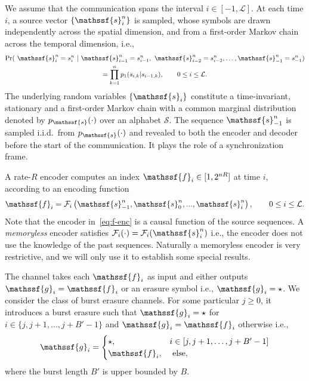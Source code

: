 \documentclass[journal, twocolumn, 10pt]{IEEEtran}
\newcommand{\cF}{{\mathcal{F}}}
\newcommand{\cS}{{\mathcal{S}}}
\newcommand{\rvf}{{\mathssf{f}}}    %
\newcommand{\rvg}{{\mathssf{g}}}    %
\newcommand{\rvs}{{\mathssf{s}}}    %
\begin{document}
We assume that the communication spans the interval $i\in [-1, \mathcal{L}]$. At each time $i$, a source vector $\{\rvs_i^n\}$ is sampled,  whose symbols are drawn independently across the spatial dimension, and from a first-order Markov chain across the temporal dimension, i.e., 
\begin{multline}
\Pr(~\rvs_i^n = s_i^n~|~\rvs_{i-1}^n = s_{i-1}^n,~\rvs_{i-2}^n = s_{i-2}^n,\ldots, \rvs^n_{-1}=s^n_{-1})  \\ = \prod_{k=1}^n p_{1}(s_{i,k}|s_{i-1,k}),
\qquad  0\le i \le \mathcal{L}.\label{eq:Markov}
\end{multline}
The underlying random variables $\{\rvs_i\}$ constitute a time-invariant, stationary and a first-order Markov chain with a common marginal distribution denoted by $p_\rvs(\cdot)$ over an alphabet $\cS$. The sequence $\rvs_{-1}^n$ is sampled i.i.d.\ from $p_\rvs(\cdot)$ and revealed to both the encoder and decoder before the start of the communication.  It plays the role of  a synchronization frame. %

A rate-$R$  encoder computes  an index $\rvf_i \in [1,2^{nR}]$ at  time $i$, according to an encoding function 
\begin{align}
\rvf_i=\mathcal{F}_i\left({\rvs}^n_{-1},{\rvs}^n_0,..., {\rvs}^n_{i}\right), \qquad  0\le i \le \mathcal{L}. \label{eq:f-enc}
\end{align} 
Note that the encoder in~\eqref{eq:f-enc} is a causal function of the source sequences. 
A {\em memoryless} encoder satisfies $\mathcal{F}_i(\cdot) = \cF_i(\rvs_i^n)$ i.e., the encoder does  not use the knowledge of the past sequences.  Naturally a memoryless encoder is very restrictive, and we will only use it to establish some special results. 

The channel takes each $\rvf_i$ as input and either outputs $\rvg_i = \rvf_i$ or an erasure symbol i.e., $\rvg_i=\star$. We consider the class of burst erasure channels. For some particular $j \ge 0$, it introduces a burst erasure such that  $\rvg_{i}=\star$ for $i\in\{j,j+1,...,j+B'-1\}$ and  $\rvg_{i}=\rvf_{i}$ otherwise i.e.,\begin{align}
\rvg_i =\begin{cases}
\star, &i \in [j,j+1,\ldots, j+B'-1]\\
\rvf_i, &\text{ else},
\end{cases}\label{eq:chModel}
\end{align} where the burst length $B'$ is upper bounded by $B$.
\end{document}
